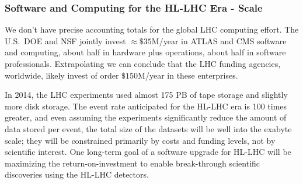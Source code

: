 \begin{frame}
\frametitle{Software and Computing for the HL-LHC Era - Scale}

We don't have precise accounting totals for the global LHC computing effort.
The U.S.\ DOE and NSF jointly invest 
$ \approx \$ 35 $M/year in
ATLAS and CMS software and computing, about half in hardware plus operations,
about half in software professionals.
Extrapolating we can conclude that the LHC funding agencies, worldwide, 
likely invest of order $ \$ 150 $M/year in these enterprises.

In 2014, the LHC experiments used almost 175 PB of tape storage and
slightly more disk storage.
The event rate anticipated for the HL-LHC era is 100 times greater,
and even assuming the experiments significantly reduce the
amount of data stored per event,
the total size of the datasets will be well into the exabyte
scale;
they will be constrained primarily by costs and funding levels,
not by scientific interest.
One long-term goal of a software upgrade for HL-LHC
will be
maximizing the return-on-investment to enable break-through
scientific discoveries using the  HL-LHC detectors.


\end{frame}


